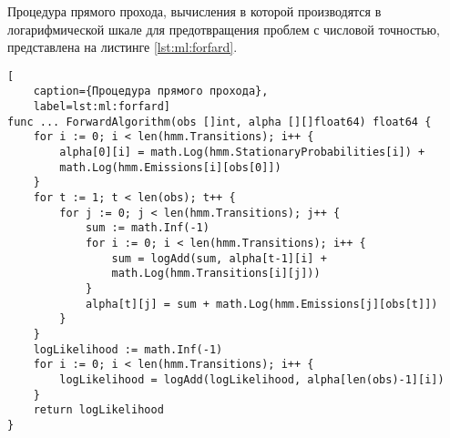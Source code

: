 Процедура прямого прохода, вычисления в которой производятся в логарифмической шкале для предотвращения проблем с числовой точностью, представлена на листинге \ref{lst:ml:forfard}.
\begin{lstlisting}[
	caption={Процедура прямого прохода},
	label=lst:ml:forfard]
func ... ForwardAlgorithm(obs []int, alpha [][]float64) float64 {
	for i := 0; i < len(hmm.Transitions); i++ {
		alpha[0][i] = math.Log(hmm.StationaryProbabilities[i]) +
		math.Log(hmm.Emissions[i][obs[0]])
	}
	for t := 1; t < len(obs); t++ {
		for j := 0; j < len(hmm.Transitions); j++ {
			sum := math.Inf(-1)
			for i := 0; i < len(hmm.Transitions); i++ {
				sum = logAdd(sum, alpha[t-1][i] + 
				math.Log(hmm.Transitions[i][j]))
			}
			alpha[t][j] = sum + math.Log(hmm.Emissions[j][obs[t]])
		}
	}
	logLikelihood := math.Inf(-1)
	for i := 0; i < len(hmm.Transitions); i++ {
		logLikelihood = logAdd(logLikelihood, alpha[len(obs)-1][i])
	}
	return logLikelihood
}
\end{lstlisting}





